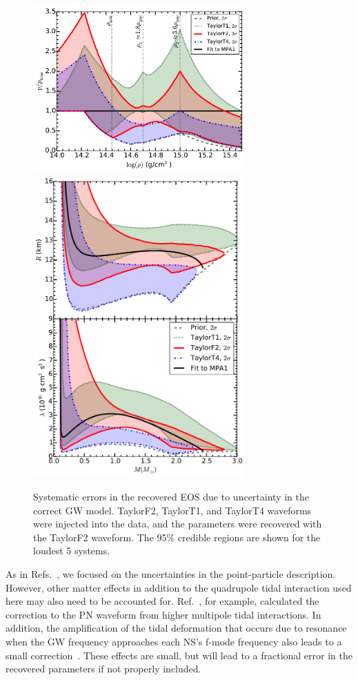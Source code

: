 \documentclass[twocolumn,prd,amssymb,aps,nofootinbib,showpacs,epsf]{revtex4}
\begin{document}
\begin{figure}[!htb]
\begin{center}
\includegraphics[width=3.2in]{LALMCMCmpa1FitCompareF2T1T4ZeroNoiseperror.pdf}\\
\includegraphics[width=3.2in]{LALMCMCmpa1FitCompareF2T1T4ZeroNoiseRadiuslambda.pdf}
\caption{Systematic errors in the recovered EOS due to uncertainty in the correct GW model. TaylorF2, TaylorT1, and TaylorT4 waveforms were injected into the data, and the parameters were recovered with the TaylorF2 waveform. The 95\% credible regions are shown for the loudest 5 systems.}
\label{fig:systematic}
\end{center}
\end{figure}

As in Refs.~\cite{Favata2014, YagiYunes2014, WadeCreightonOchsner2014}, we focused on the uncertainties in the point-particle description. However, other matter effects in addition to the quadrupole tidal interaction used here may also need to be accounted for. Ref.~\cite{Yagi2014}, for example, calculated the correction to the PN waveform from higher multipole tidal interactions. In addition, the amplification of the tidal deformation that occurs due to resonance when the GW frequency approaches each NS's f-mode frequency also leads to a small correction~\cite{FlanaganHinderer2008}. These effects are small, but will lead to a fractional error in the recovered parameters if not properly included. 
\end{document}
